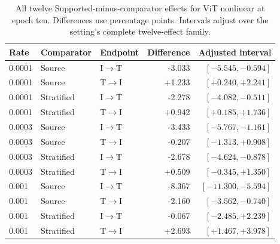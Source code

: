 \begin{table}[t]
\centering
\small
\setlength{\tabcolsep}{3pt}
\begin{tabular}{lllrr}
\toprule
Rate & Comparator & Endpoint & Difference & Adjusted interval\\
\midrule
0.0001 & Source & I$\to$T & -3.033 & $[-5.545,-0.594]$ \\
0.0001 & Source & T$\to$I & +1.233 & $[+0.240,+2.241]$ \\
0.0001 & Stratified & I$\to$T & -2.278 & $[-4.082,-0.511]$ \\
0.0001 & Stratified & T$\to$I & +0.942 & $[+0.185,+1.736]$ \\
0.0003 & Source & I$\to$T & -3.433 & $[-5.767,-1.161]$ \\
0.0003 & Source & T$\to$I & -0.207 & $[-1.313,+0.908]$ \\
0.0003 & Stratified & I$\to$T & -2.678 & $[-4.624,-0.878]$ \\
0.0003 & Stratified & T$\to$I & +0.509 & $[-0.345,+1.350]$ \\
0.001 & Source & I$\to$T & -8.367 & $[-11.300,-5.594]$ \\
0.001 & Source & T$\to$I & -2.160 & $[-3.562,-0.740]$ \\
0.001 & Stratified & I$\to$T & -0.067 & $[-2.485,+2.239]$ \\
0.001 & Stratified & T$\to$I & +2.693 & $[+1.467,+3.978]$ \\
\bottomrule
\end{tabular}
\caption{All twelve Supported-minus-comparator effects for ViT nonlinear at epoch ten. Differences use percentage points. Intervals adjust over the setting's complete twelve-effect family.}\label{tab:nonlinearpartial}
\end{table}
